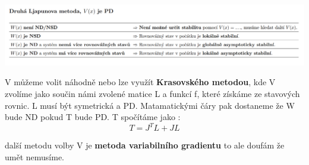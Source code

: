 \includegraphics[scale = 0.6]{img/Ljap.2.png}

V můžeme volit náhodně nebo lze využít {\bf Krasovského metodou}, kde V zvolíme jako součin námi zvolené matice L a funkcí f, které získáme ze stavových rovnic.
L musí být symetrická a PD. Matamatickými čáry pak dostaneme že W bude ND pokud T bude PD.
T spočítáme jako :
\begin{equation*}
    T=J^TL+JL
\end{equation*}

další metodu volby V je {\bf metoda variabilního gradientu } to ale doufám že umět nemusíme.


